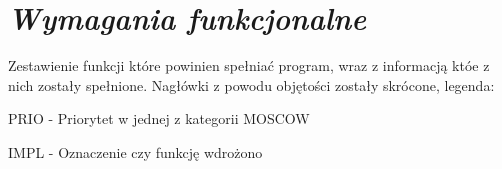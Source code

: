 \documentclass[a4paper,10pt, twoside]{report}
\newcommand{\customstylechapter}[1]{\large{\textit{#1}}}
\begin{document}
\chapter{\customstylechapter{Wymagania funkcjonalne}} 
\label{Wymagania funkcjonalne}
{Zestawienie funkcji które powinien spełniać program, wraz z informacją któe 
z nich zostały spełnione. Nagłówki z powodu objętości zostały skrócone, legenda:}

{PRIO - Priorytet w jednej z kategorii MOSCOW \cite{MOSCOW}}

{IMPL - Oznaczenie czy funkcję wdrożono}

\begin{table}[h]
    \footnotesize
    \begin{tabular}{|p{0.2\linewidth}|p{0.07\linewidth}|p{0.07\linewidth}|p{0.52\linewidth}|}  %
    \hline                  %
        

\end{tabular}
\end{table}
\end{document}
